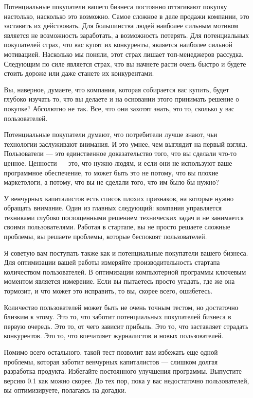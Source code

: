 \documentclass[ebook,12pt,oneside,openany]{memoir}
\begin{document}
Потенциальные покупатели вашего бизнеса постоянно оттягивают покупку
настолько, насколько это возможно. Самое сложное в деле продажи
компании, это заставить их действовать. Для большинства людей наиболее
сильным мотивом является не возможность заработать, а возможность
потерять. Для потенциальных покупателей страх, что вас купят их
конкуренты, является наиболее сильной мотивацией. Насколько мы поняли,
этот страх лишает топ-менеджеров рассудка. Следующим по силе является
страх, что вы начнете расти очень быстро и будете стоить дороже или
даже станете их конкурентами.

Вы, наверное, думаете, что компания, которая собирается вас купить,
будет глубоко изучать то, что вы делаете и на основании этого
принимать решение о покупке? Абсолютно не так. Все, что они захотят
знать, это то, сколько у вас пользователей.

Потенциальные покупатели думают, что потребители лучше знают, чьи
технологии заслуживают внимания. И это умнее, чем выглядит на первый
взгляд. Пользователи — это единственное доказательство того, что вы
сделали что-то ценное. Ценности — это, что нужно людям, и если они не
используют ваше программное обеспечение, то может быть это не потому,
что вы плохие маркетологи, а потому, что вы не сделали того, что им
было бы нужно?

У венчурных капиталистов есть список плохих признаков, на которые
нужно обращать внимание. Один из главных следующий: компания
управляется техниками глубоко поглощенными решением технических задач
и не занимается своими пользователями. Работая в стартапе, вы не
просто решаете сложные проблемы, вы решаете проблемы, которые
беспокоят пользователей.

Я советую вам поступать также как и потенциальные покупатели вашего
бизнеса. Для оптимизации вашей работы измеряйте производительность
стартапа количеством пользователей. В оптимизации компьютерной
программы ключевым моментом является измерение. Если вы пытаетесь
просто угадать, где же она тормозит, и что может это исправить, то вы,
скорее всего, ошибетесь.

Количество пользователей может быть не очень точным тестом, но
достаточно близким к этому. Это то, что заботит потенциальных
покупателей бизнеса в первую очередь. Это то, от чего зависит прибыль.
Это то, что заставляет страдать конкурентов. Это то, что впечатляет
журналистов и новых пользователей.

Помимо всего остального, такой тест позволит вам избежать еще одной
проблемы, которая заботит венчурных капиталистов — слишком долгая
разработка продукта. Избегайте постоянного улучшения программы.
Выпустите версию 0.1 как можно скорее. До тех пор, пока у вас
недостаточно пользователей, вы оптимизируете, полагаясь на догадки.
\end{document}
